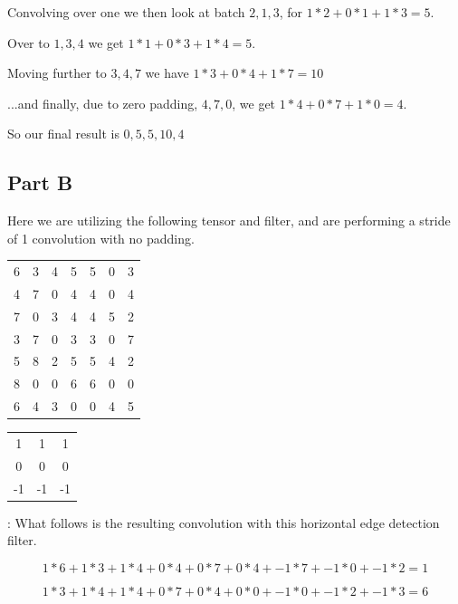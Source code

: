 \documentclass{article}
\begin{document}
\noindent Convolving over one we then look at batch ${2, 1, 3}$, for $1*2 + 0*1 + 1*3 = 5$.

\noindent Over to ${1,3,4}$ we get $1*1 + 0*3 + 1*4 = 5$.

\noindent Moving further to ${3,4,7}$ we have $1*3 + 0*4 + 1*7 = 10$

\noindent ...and finally, due to zero padding, ${4,7,0}$, we get $1*4 + 0*7 + 1*0 = 4$.

\noindent So our final result is ${0, 5, 5, 10, 4}$

\subsection*{Part B}

Here we are utilizing the following tensor and filter, and are performing a stride of 1 convolution with no padding.

\begin{center}
    \begin{tabular}{c c c c c c c}
        6 & 3 & 4 & 5 & 5 & 0 & 3 \\
        4 & 7 & 0 & 4 & 4 & 0 & 4 \\
        7 & 0 & 3 & 4 & 4 & 5 & 2 \\
        3 & 7 & 0 & 3 & 3 & 0 & 7 \\
        5 & 8 & 2 & 5 & 5 & 4 & 2 \\
        8 & 0 & 0 & 6 & 6 & 0 & 0 \\
        6 & 4 & 3 & 0 & 0 & 4 & 5 \\
    \end{tabular}
\end{center}

\begin{center}
    \begin{tabular}{c c c}
        1 & 1 & 1 \\
        0 & 0 & 0 \\
        -1 & -1 & -1\\
    \end{tabular}
\end{center}

\noindent: What follows is the resulting convolution with this horizontal edge detection filter.

\begin{equation}
    1*6 + 1*3 + 1*4 + 0*4 + 0*7 + 0*4 + -1*7 + -1*0 + -1*2 = 1
\end{equation}

\begin{equation}
    1*3 + 1*4 + 1*4 + 0*7 + 0*4 + 0*0 + -1*0 + -1*2 + -1*3 = 6
\end{equation}
\end{document}
